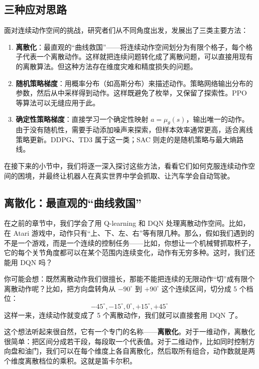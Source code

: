 \documentclass[lang=cn,zihao=-4,a4paper,fontset=windows]{beautybook}
\begin{document}
\subsection{三种应对思路}

面对连续动作空间的挑战，研究者们从不同角度出发，发展出了三类主要方法：

\begin{enumerate}
    \item \textbf{离散化}：最直观的“曲线救国”——将连续动作空间划分为有限个格子，每个格子代表一个离散动作。这样就把连续问题转化成了离散问题，可以直接用现有的离散算法。但这种方法存在维度灾难和精度损失的问题。
    \item \textbf{随机策略梯度}：用概率分布（如高斯分布）来描述动作。策略网络输出分布的参数，然后从中采样得到动作。这样既避免了枚举，又保留了探索性。PPO 等算法可以无缝应用于此。
    \item \textbf{确定性策略梯度}：直接学习一个确定性映射 $a = \mu_\theta(s)$，输出唯一的动作。由于没有随机性，需要手动添加噪声来探索，但样本效率通常更高，适合离线策略更新。DDPG、TD3 属于这一类；SAC 则走的是随机策略与最大熵路线。
\end{enumerate}

在接下来的小节中，我们将逐一深入探讨这些方法，看看它们如何克服连续动作空间的困境，并最终让机器人在真实世界中学会抓取、让汽车学会自动驾驶。

\subsection{离散化：最直观的“曲线救国”}

在之前的章节中，我们学会了用 Q-learning 和 DQN 处理离散动作空间。比如，在 Atari 游戏中，动作只有“上、下、左、右”等有限几种。那么，假如我们遇到的不是一个游戏，而是一个连续的控制任务——比如，你想让一个机械臂抓取杯子，它的每个关节角度都可以在某个范围内连续变化，动作有无穷多种。这时，我们还能用 DQN 吗？

你可能会想：既然离散动作我们很擅长，那能不能把连续的无限动作“切”成有限个离散动作呢？比如，把方向盘转角从 \(-90^\circ\) 到 \(+90^\circ\) 这个连续区间，切分成 5 个档位： \[-45^\circ, -15^\circ, 0^\circ, +15^\circ, +45^\circ\]这样一来，连续动作就变成了 5 个离散动作，我们就可以直接套用 DQN 了。

这个想法听起来很自然，它有一个专门的名称——\textbf{离散化}。对于一维动作，离散化很简单：把区间分成若干段，每段取一个代表值。对于二维动作，比如同时控制方向盘和油门，我们可以在每个维度上各自离散化，然后取所有组合，动作数就是两个维度离散档位的乘积。这就是笛卡尔积。
\end{document}
